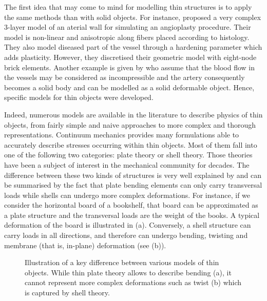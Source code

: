 The first idea that may come to mind for modelling thin structures is to apply the same methods than with solid objects. For instance, \cite{Holzapfel02} proposed a very complex 3-layer model of an aterial wall for simulating an angioplasty procedure. Their model is non-linear and anisotropic along fibers placed according to histology. They also model diseased part of the vessel through a hardening parameter which adds plasticity. However, they discretised their geometric model with eight-node brick elements. Another example is given by \cite{Aloisio04} who assume that the blood flow in the vessels may be considered as incompressible and the artery consequently becomes a solid body and can be modelled as a solid deformable object.  Hence, specific models for thin objects were developed. 

Indeed, numerous models are available in the literature to describe physics of thin objects, from fairly simple and naive approaches to more complex and thorough representations. Continuum mechanics provides many formulations able to accurately describe stresses occurring within thin objects. Most of them fall into one of the following two categories: plate theory or shell theory. Those theories have been a subject of interest in the mechanical community for decades. The difference between these two kinds of structures is very well explained by \cite{Liu03} and can be summarised by the fact that plate bending elements can only carry transversal loads while shells can undergo more complex deformations. 
For instance, if we consider the horizontal board of a bookshelf, that board can be approximated as a plate structure and the transversal loads are the weight of the books. A typical deformation of the board is illustrated in  (a). Conversely, a shell structure can carry loads in all directions, and therefore can undergo bending, twisting and membrane (that is, in-plane) deformation (see  (b)). 
%
\begin{figure}[ht]
\centering 
{}
\hfill 
{}
\caption[Illustration of the key difference between plate and shell theory]{Illustration of a key difference between various models of thin objects. While thin plate theory allows to describe bending (a), it cannot represent more complex deformations such as twist (b) which is captured by shell theory.}
\label{chap7:fig-boards}
\end{figure}


